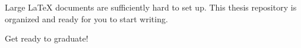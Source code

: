 

Large LaTeX documents are sufficiently hard to set up.
This thesis repository is organized and ready for you to start writing.

Get ready to graduate!
